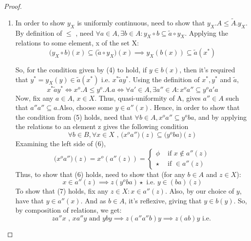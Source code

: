 \documentclass[18pt,a4paper]{article}
\theoremstyle{definition}
\begin{document}
\begin{proof}
\item \begin{enumerate}[label=(\alph*)]
	\item In order to show $y_X$ is uniformly continuous, need to show that $y_X.A \leq \tilde{A}.y_X $.
		By definition of $\leq$ , need $\forall a\in A, \exists b \in A:
		y_X \circ b \subseteq \tilde{a} \circ y_X $. Applying the relations
		to some element, x of the set X:
		\begin{equation} \big(y_X \circ b\big)(x) \subseteq \big( \tilde{a} \circ y_X\big)(x) \implies
		y_X(b(x)) \subseteq \tilde{a}(x^*) \end{equation}

		So, for the condition given by (4) to hold, if $y \in b(x)$, then it's required that
		$y^*=y_X(y) \in \tilde{a} (x^*)$ i.e. $x^* \tilde{a}y^*$. Using the definition of $x^*,y^*$
		and $\tilde{a}$,
		\begin{equation} x^* \tilde{a}y^* \iff x^o.A\leq y^o.A.a \iff
		\forall a' \in A, \exists a'' \in A: x^oa'' \subseteq y^oa'a  \end{equation}
		Now, fix any $a \in A$, $x\in X$. Thus, quasi-uniformity of A, gives $a'' \in A$ such that
		$a''a''\subseteq a$.Also, choose some $y \in a''(x)$. Hence, in
		order to show that the condition from (5) holds, need that
		$\forall b \in A, x^o a'' \subseteq y^oba$, and by applying the relations to an element z
		gives the following condition
		\begin{equation} \forall b \in B, \forall x \in X \text{ , }
		\big(x^oa''\big)(z) \subseteq \big(y^oba\big)(z) \end{equation}
		Examining the left side of (6),
		\[ \big( x^oa''\big)(z)=x^o (a''(z))= \begin{cases}
			\phi &\text{ if } x \notin a''(z) \\
			\star & \text{ if } \in a''(z)
		\end{cases} \]
		Thus, to show that (6) holds, need to show that (for any $b\in A$ and $z \in X$):
		\begin{equation} x \in a''(z) \implies z(y^oba)\star \text{ i.e. } y\in(ba)(z)
		\end{equation}
		To show that (7) holds, fix any $z\in X: x \in a''(z)$. Also, by our choice of $y$,
		have that $y \in a''(x)$. And as $b\in A$, it's reflexive, giving that $y \in b(y)$.
		So, by composition of relations, we get:
		\[ za''x \text{ , }  xa''y \text{ and } yby \implies z(a''a''b)y \implies z(ab)y \text{ i.e. }
\]
\end{enumerate}
\end{proof}
\end{document}
